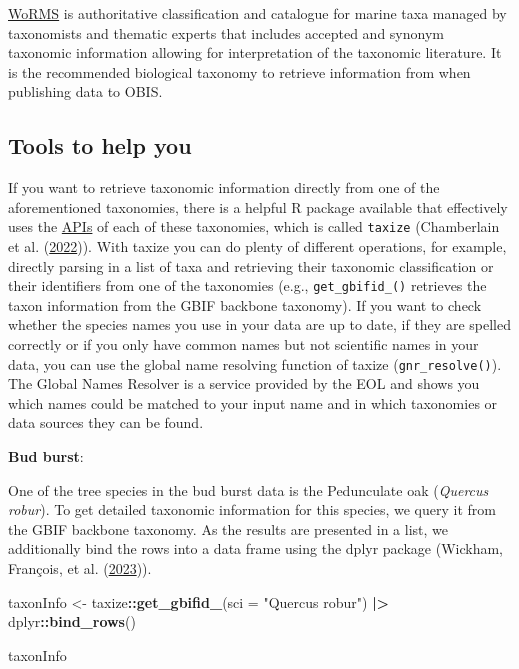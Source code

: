 \documentclass[
]{book}
\newenvironment{Shaded}{\begin{snugshade}}{\end{snugshade}}
\newcommand{\AttributeTok}[1]{\textcolor[rgb]{0.13,0.29,0.53}{#1}}
\newcommand{\FunctionTok}[1]{\textcolor[rgb]{0.13,0.29,0.53}{\textbf{#1}}}
\newcommand{\NormalTok}[1]{#1}
\newcommand{\OtherTok}[1]{\textcolor[rgb]{0.56,0.35,0.01}{#1}}
\newcommand{\SpecialCharTok}[1]{\textcolor[rgb]{0.81,0.36,0.00}{\textbf{#1}}}
\newcommand{\StringTok}[1]{\textcolor[rgb]{0.31,0.60,0.02}{#1}}
\begin{document}
\href{https://www.marinespecies.org/}{WoRMS} is authoritative classification and catalogue for marine taxa managed by taxonomists and thematic experts that includes accepted and synonym taxonomic information allowing for interpretation of the taxonomic literature. It is the recommended biological taxonomy to retrieve information from when publishing data to OBIS.

\hypertarget{tools-to-help-you-3}{%
\subsection{Tools to help you}\label{tools-to-help-you-3}}

If you want to retrieve taxonomic information directly from one of the aforementioned taxonomies, there is a helpful R package available that effectively uses the \protect\hyperlink{API}{APIs} of each of these taxonomies, which is called \texttt{taxize} (Chamberlain et al. (\protect\hyperlink{ref-R-taxize}{2022})). With taxize you can do plenty of different operations, for example, directly parsing in a list of taxa and retrieving their taxonomic classification or their identifiers from one of the taxonomies (e.g., \texttt{get\_gbifid\_()} retrieves the taxon information from the GBIF backbone taxonomy). If you want to check whether the species names you use in your data are up to date, if they are spelled correctly or if you only have common names but not scientific names in your data, you can use the global name resolving function of taxize (\texttt{gnr\_resolve()}). The Global Names Resolver is a service provided by the EOL and shows you which names could be matched to your input name and in which taxonomies or data sources they can be found.

\textbf{Bud burst}:

One of the tree species in the bud burst data is the Pedunculate oak (\emph{Quercus robur}). To get detailed taxonomic information for this species, we query it from the GBIF backbone taxonomy. As the results are presented in a list, we additionally bind the rows into a data frame using the dplyr package (Wickham, François, et al. (\protect\hyperlink{ref-dplyr_2023}{2023})).

\begin{Shaded}
\begin{Highlighting}[]
\NormalTok{taxonInfo }\OtherTok{\textless{}{-}}\NormalTok{ taxize}\SpecialCharTok{::}\FunctionTok{get\_gbifid\_}\NormalTok{(}\AttributeTok{sci =} \StringTok{"Quercus robur"}\NormalTok{) }\SpecialCharTok{|\textgreater{}}
\NormalTok{  dplyr}\SpecialCharTok{::}\FunctionTok{bind\_rows}\NormalTok{()}
  
\NormalTok{taxonInfo}
\end{Highlighting}
\end{Shaded}
\end{document}
